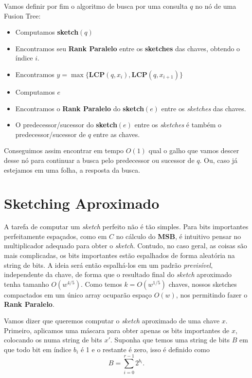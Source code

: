 Vamos definir por fim o algoritmo de busca por uma consulta $q$ no nó de uma Fusion
Tree:

\begin{itemize}
    \item Computamos \textbf{sketch}$(q)$
    \item Encontramos seu \textbf{Rank Paralelo} entre os \textbf{sketches} das
    chaves, obtendo o índice $i$.
    \item Encontramos $y= \max\{\textbf{LCP}(q, x_i),\textbf{LCP}(q, x_{i+1})\}$
    \item Computamos $e$
    \item Encontramos o \textbf{Rank Paralelo} do \textbf{sketch}$(e)$ entre os
    \textit{sketches} das chaves.
    \item O predecessor/sucessor do \textbf{sketch}$(e)$ entre os
    \textit{sketches} é também o predecessor/sucessor de $q$ entre as chaves.
\end{itemize}

Conseguimos assim encontrar em tempo $O(1)$ qual o galho que vamos descer desse
nó para continuar a busca pelo predecessor ou sucessor de $q$. Ou, caso já
estejamos em uma folha, a resposta da busca.

\section{Sketching Aproximado}

A tarefa de computar um \textit{sketch} perfeito não é tão simples. Para bits
importantes perfeitamente espaçados, como em $C$ no cálculo do \textbf{MSB}, é
intuitivo pensar no multiplicador adequado para obter o \textit{sketch}.
Contudo, no caso geral, as coisas são mais complicadas, os bits importantes
estão espalhados de forma aleatória na string de bits. A ideia será então
espalhá-los em um padrão \emph{previsível}, independente da chave, de forma que
o resultado final do \textit{sketch} aproximado tenha tamanho $O(w^{4/5})$. Como
temos $k=O(w^{1/5})$ chaves, nossos sketches compactados em um único array
ocuparão espaço $O(w)$, nos permitindo fazer o \textbf{Rank Paralelo}.

Vamos dizer que queremos computar o \textit{sketch} aproximado de uma chave $x$.
Primeiro, aplicamos uma máscara para obter apenas os bits importantes de $x$,
colocando os numa string de bits $x'$. Suponha que temos uma string de bits $B$
em que todo bit em índice $b_i$ é 1 e o restante é zero, isso é definido como
\[
B=\sum_{i=0}^{r-1}2^{b_i}.
\]

